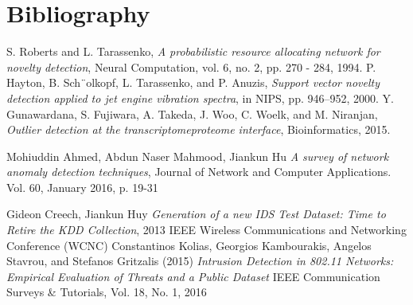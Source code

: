 \documentclass{beamer}
\begin{document}
\section{Bibliography}
\frame
{
\scriptsize

\begin{thebibliography}{6}
 S. Roberts and L. Tarassenko, \emph{A probabilistic resource allocating network for novelty detection}, Neural Computation, vol. 6, no. 2, pp. 270 - 284, 1994.
 P. Hayton, B. Sch¨olkopf, L. Tarassenko, and P. Anuzis, \emph{Support vector novelty detection applied to jet engine vibration spectra}, in NIPS, pp. 946–952, 2000.
 Y. Gunawardana, S. Fujiwara, A. Takeda, J. Woo, C. Woelk, and M. Niranjan, \emph{Outlier detection at the transcriptomeproteome interface}, Bioinformatics, 2015.

 Mohiuddin Ahmed, Abdun Naser Mahmood, Jiankun Hu \emph{A survey of network anomaly detection techniques}, Journal of Network and Computer Applications. Vol. 60, January 2016, p. 19-31

 Gideon Creech, Jiankun Huy \emph{Generation of a new IDS Test Dataset: Time to Retire the KDD Collection}, 
2013 IEEE Wireless Communications and Networking Conference (WCNC)
 Constantinos Kolias, Georgios Kambourakis, Angelos Stavrou, and Stefanos Gritzalis (2015) \emph{Intrusion Detection in 802.11 Networks: Empirical Evaluation of Threats and a Public Dataset} IEEE Communication Surveys \& Tutorials, Vol. 18, No. 1, 2016
\end{thebibliography}
}
\end{document}

